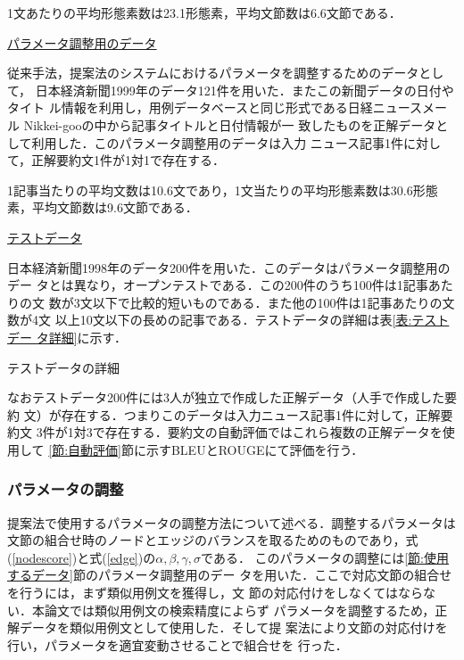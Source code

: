 \documentclass[japanese]{jnlp_1.4}
\def\toolref#1{}
\begin{document}
1文あたりの平均形態素数は23.1形態素，平均文節数は6.6文節である．


\noindent \ul{パラメータ調整用のデータ}

従来手法，提案法のシステムにおけるパラメータを調整するためのデータとして，
日本経済新聞1999年のデータ121件を用いた．またこの新聞データの日付やタイト
ル情報を利用し，用例データベースと同じ形式である日経ニュースメール
Nikkei-goo\toolref{言語資源:nikkei-goo}の中から記事タイトルと日付情報が一
致したものを正解データとして利用した．このパラメータ調整用のデータは入力
ニュース記事1件に対して，正解要約文1件が1対1で存在する．

1記事当たりの平均文数は10.6文であり，1文当たりの平均形態素数は30.6形態
素，平均文節数は9.6文節である．

\noindent \ul{テストデータ}

日本経済新聞1998年のデータ200件を用いた．このデータはパラメータ調整用のデー
タとは異なり，オープンテストである．この200件のうち100件は1記事あたりの文
数が3文以下で比較的短いものである．また他の100件は1記事あたりの文数が4文
以上10文以下の長めの記事である．テストデータの詳細は表\ref{表:テストデー
タ詳細}に示す．

\begin{table}[b]
\caption{テストデータの詳細} \label{表:テストデータ詳細}

\end{table}

なおテストデータ200件には3人が独立で作成した正解データ（人手で作成した要約
文）が存在する．つまりこのデータは入力ニュース記事1件に対して，正解要約文
3件が1対3で存在する．要約文の自動評価ではこれら複数の正解データを使用して
\ref{節:自動評価}節に示すBLEUとROUGEにて評価を行う．

\subsubsection{パラメータの調整}\label{節:パラメータの調整}

提案法で使用するパラメータの調整方法について述べる．調整するパラメータは
文節の組合せ時のノードとエッジのバランスを取るためのものであり，式
(\ref{nodescore})と式(\ref{edge})の$\alpha, \beta, \gamma, \sigma$である．
このパラメータの調整には\ref{節:使用するデータ}節のパラメータ調整用のデー
タを用いた．ここで対応文節の組合せを行うには，まず類似用例文を獲得し，文
節の対応付けをしなくてはならない．本論文では類似用例文の検索精度によらず
パラメータを調整するため，正解データを類似用例文として使用した．そして提
案法により文節の対応付けを行い，パラメータを適宜変動させることで組合せを
行った．
\end{document}
